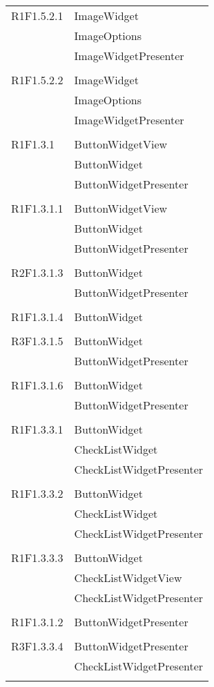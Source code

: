 \begin{center}
\begin{longtable}{|p{7cm}|p{5cm}|}
		R1F1.5.2.1 & ImageWidget \\ & ImageOptions \\ & ImageWidgetPresenter \\ & \\ \hline
		R1F1.5.2.2 & ImageWidget \\ & ImageOptions \\ & ImageWidgetPresenter \\ & \\ \hline
		R1F1.3.1 & ButtonWidgetView \\ & ButtonWidget \\ & ButtonWidgetPresenter \\ & \\ \hline
		R1F1.3.1.1 & ButtonWidgetView \\ & ButtonWidget \\ & ButtonWidgetPresenter \\ & \\ \hline
		R2F1.3.1.3 & ButtonWidget \\ & ButtonWidgetPresenter \\ & \\ \hline
		R1F1.3.1.4 & ButtonWidget \\ & \\ \hline
		R3F1.3.1.5 & ButtonWidget \\ & ButtonWidgetPresenter \\ & \\ \hline
		R1F1.3.1.6 & ButtonWidget \\ & ButtonWidgetPresenter \\ & \\ \hline
		R1F1.3.3.1 & ButtonWidget \\ & CheckListWidget \\ & CheckListWidgetPresenter \\ & \\ \hline
		R1F1.3.3.2 & ButtonWidget \\ & CheckListWidget \\ & CheckListWidgetPresenter \\ & \\ \hline
		R1F1.3.3.3 & ButtonWidget \\ & CheckListWidgetView \\ & CheckListWidgetPresenter \\ & \\ \hline
		R1F1.3.1.2 & ButtonWidgetPresenter \\ & \\ \hline
		R3F1.3.3.4 & ButtonWidgetPresenter \\ & CheckListWidgetPresenter \\ & \\ \hline

\end{longtable}
\end{center}
